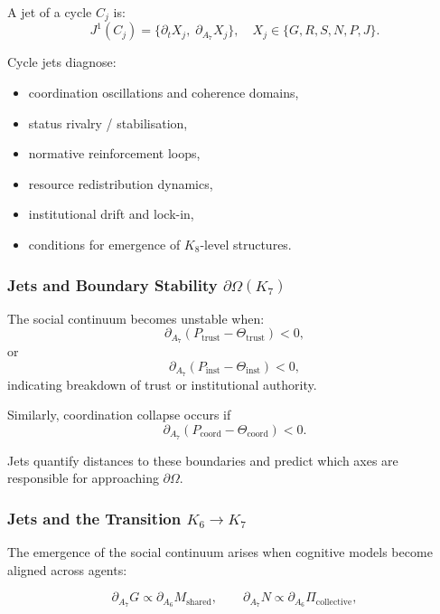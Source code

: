A jet of a cycle $C_j$ is:
\[
J^1(C_j)
=
\{
\partial_t X_j,\;
\partial_{A_7}X_j
\},
\quad
X_j\in\{G,R,S,N,P,J\}.
\]

Cycle jets diagnose:
\begin{itemize}
    \item coordination oscillations and coherence domains,
    \item status rivalry / stabilisation,
    \item normative reinforcement loops,
    \item resource redistribution dynamics,
    \item institutional drift and lock-in,
    \item conditions for emergence of $K_8$-level structures.
\end{itemize}


\subsubsection{Jets and Boundary Stability \texorpdfstring{$\partial\Omega(K_7)$}{\partial\Omega(K_7)}}

The social continuum becomes unstable when:
\[
\partial_{A_7}(P_{\mathrm{trust}} - \Theta_{\mathrm{trust}}) < 0,
\]
or
\[
\partial_{A_7}(P_{\mathrm{inst}} - \Theta_{\mathrm{inst}}) < 0,
\]
indicating breakdown of trust or institutional authority.

Similarly, coordination collapse occurs if
\[
\partial_{A_7}(P_{\mathrm{coord}} - \Theta_{\mathrm{coord}})<0.
\]

Jets quantify distances to these boundaries and predict which axes are
responsible for approaching $\partial\Omega$.


\subsubsection{Jets and the Transition \texorpdfstring{$K_6 \to K_7$}{K_6 \to K_7}}

The emergence of the social continuum arises when cognitive models
become aligned across agents:

\[
\partial_{A_7}G
\propto
\partial_{A_6}M_{\mathrm{shared}},
\qquad
\partial_{A_7}N
\propto
\partial_{A_6}\Pi_{\mathrm{collective}},
\]

